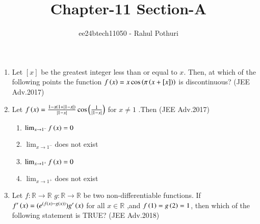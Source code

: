 \documentclass[journal,12pt,twocolumn]{IEEEtran}
\theoremstyle{remark}
\begin{document}

\vspace{3cm}
\title{Chapter-11 Section-A }
\author{ee24btech11050 - Rahul Pothuri}
\maketitle
\newpage
\bigskip
\renewcommand{\thefigure}{\theenumi}
\renewcommand{\thetable}{\theenumi}
\begin{enumerate}[start=26]
\item %
Let $[x]$ be the greatest integer less than or equal to $x$. Then, at which of the following points the function
$f\left(x\right) = x \cos\left(\pi\left(x + [x]\right)\right)$ is discontinuous? 
 \hfill  (JEE Adv.2017) \\
\begin{enumerate} 
\end{enumerate}
\item %
 Let $f\left(x\right)=\frac{1-x \left(1+\left\vert1-x\right\vert\right)}{\left\vert1-x\right\vert}\cos\left(\frac{1}{\left\vert1-x\right\vert}\right)$ for $x\neq1$ .Then  
\hfill (JEE Adv.2017) \\ 
\begin{enumerate}
\item $\lim_{x\to1^-} f\left(x\right)=0$ 
\item $\lim_{x\to1^-}$does not exist
\item $\lim_{x\to1^+} f\left(x\right)=0$ 
\item $\lim_{x\to1^+}$does not exist 
\end{enumerate}
\item %
Let $f:\mathbb{R} \to \mathbb{R}$ $g:\mathbb{R} \to \mathbb{R}$ be two non-differentiable functions. If $f'\left(x\right)=(e^{\left(f\left(x\right)-g\left(x\right)\right)})g'\left(x\right)$ for all $x\in \mathbb{R}$ ,and $f\left(1\right)=g\left(2\right)=1$, then which of the following statement  is  TRUE? 
\hfill  (JEE Adv.2018) \\ 
\begin{enumerate}
\end{enumerate}
\end{enumerate}
\end{document}
